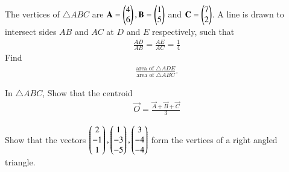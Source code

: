 %
\item The vertices of $\triangle ABC$ are $\mathbf{A}=\begin{pmatrix}4\\6\end{pmatrix},  \mathbf{B}=\begin{pmatrix}1\\5\end{pmatrix}$ and  $\mathbf{C} =  \begin{pmatrix}7\\2\end{pmatrix}$.  A line is drawn to intersect sides $AB$ and $AC$ at $D$ and $E$ respectively, such that
\begin{align}
\frac{AD}{AB}=\frac{AE}{AC}= \frac{1}{4}
\end{align}
%
Find 
\begin{align}
\frac{\text{area of }\triangle ADE}{\text{area of }\triangle ABC}.
\end{align}
\item In $\triangle ABC$, Show that the centroid 
\begin{align}
\vec{O} = \frac{\vec{A}+\vec{B}+\vec{C}}{3}
\end{align}

\item Show that the vectors 
$
\begin{pmatrix}2\\-1 \\1\end{pmatrix},
\begin{pmatrix}1\\-3 \\-5\end{pmatrix},
\begin{pmatrix}3\\ -4\\-4\end{pmatrix}
$
form the vertices of a right angled triangle.

